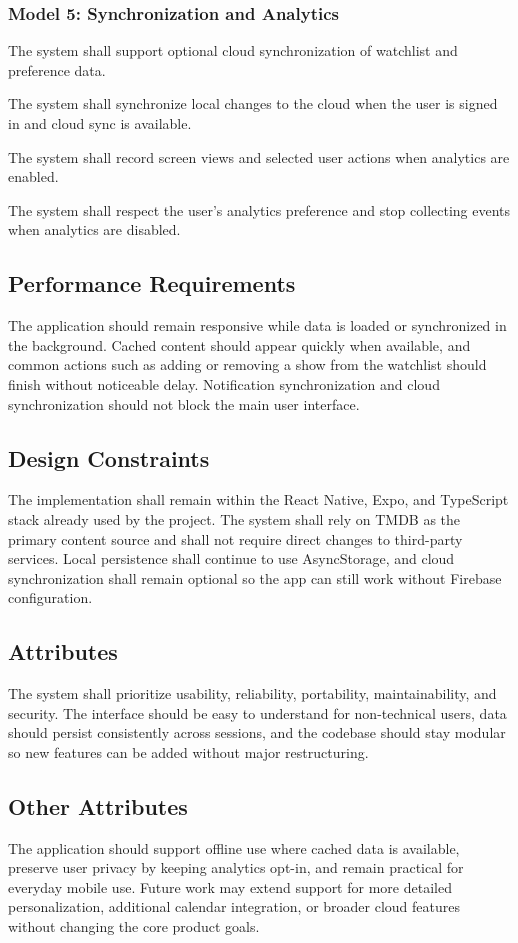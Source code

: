 \subsubsection{Model 5: Synchronization and Analytics}
\begin{description}[leftmargin=1.8cm, style=nextline]
	\item[FR-5.1] The system shall support optional cloud synchronization of watchlist and preference data.
	\item[FR-5.2] The system shall synchronize local changes to the cloud when the user is signed in and cloud sync is available.
	\item[FR-5.3] The system shall record screen views and selected user actions when analytics are enabled.
	\item[FR-5.4] The system shall respect the user’s analytics preference and stop collecting events when analytics are disabled.
\end{description}

\subsection{Performance Requirements}
The application should remain responsive while data is loaded or synchronized in the background. Cached content should appear quickly when available, and common actions such as adding or removing a show from the watchlist should finish without noticeable delay. Notification synchronization and cloud synchronization should not block the main user interface.

\subsection{Design Constraints}
The implementation shall remain within the React Native, Expo, and TypeScript stack already used by the project. The system shall rely on TMDB as the primary content source and shall not require direct changes to third-party services. Local persistence shall continue to use AsyncStorage, and cloud synchronization shall remain optional so the app can still work without Firebase configuration.

\subsection{Attributes}
The system shall prioritize usability, reliability, portability, maintainability, and security. The interface should be easy to understand for non-technical users, data should persist consistently across sessions, and the codebase should stay modular so new features can be added without major restructuring.

\subsection{Other Attributes}
The application should support offline use where cached data is available, preserve user privacy by keeping analytics opt-in, and remain practical for everyday mobile use. Future work may extend support for more detailed personalization, additional calendar integration, or broader cloud features without changing the core product goals.